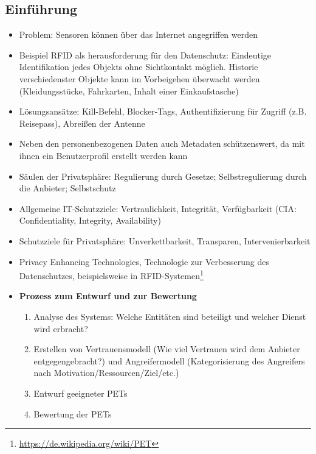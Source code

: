 \subsection{Einführung}
\begin{itemize}
	\item Problem: Sensoren können über das Internet angegriffen werden
	\item Beispiel RFID als herausforderung für den Datenschutz: Eindeutige Identifikation jedes Objekts ohne Sichtkontakt möglich. Historie verschiedenster Objekte kann im Vorbeigehen überwacht werden (Kleidungsstücke, Fahrkarten, Inhalt einer Einkaufstasche)
	\item Lösungsansätze: Kill-Befehl, Blocker-Tags, Authentifizierung für Zugriff (z.B. Reisepass), Abreißen der Antenne
	\item Neben den personenbezogenen Daten auch Metadaten schützenswert, da mit ihnen ein Benutzerprofil erstellt werden kann
	\item Säulen der Privatsphäre: Regulierung durch Gesetze; Selbstregulierung durch die Anbieter; Selbstschutz
	\item Allgemeine IT-Schutzziele: Vertraulichkeit, Integrität, Verfügbarkeit (CIA: Confidentiality, Integrity, Availability)
	\item Schutzziele für Privatsphäre: Unverkettbarkeit, Transparen, Intervenierbarkeit
	\item Privacy Enhancing Technologies, Technologie zur Verbesserung des Datenschutzes, beispielsweise in RFID-Systemen\footnote{\url{https://de.wikipedia.org/wiki/PET}}
	\item \textbf{Prozess zum Entwurf und zur Bewertung}
	\begin{enumerate}
		\item Analyse des Systems: Welche Entitäten sind beteiligt und welcher Dienst wird erbracht?
		\item Erstellen von Vertrauensmodell (Wie viel Vertrauen wird dem Anbieter entgegengebracht?) und Angreifermodell (Kategorisierung des Angreifers nach Motivation/Ressourcen/Ziel/etc.)
		\item Entwurf geeigneter PETs
		\item Bewertung der PETs
	\end{enumerate}
\end{itemize}


